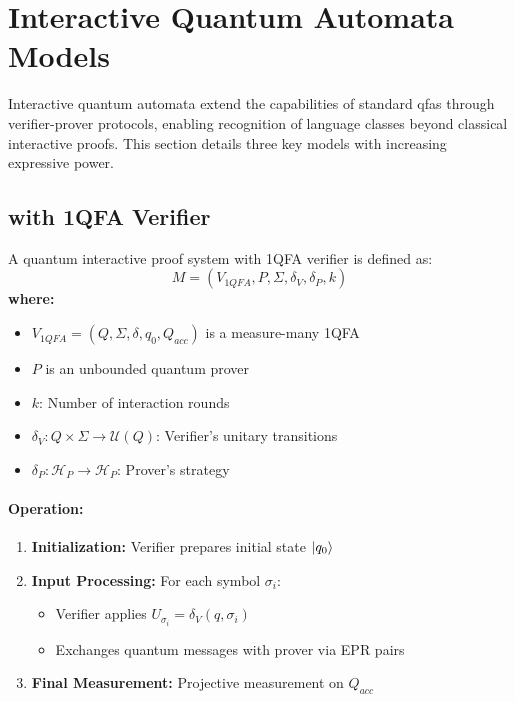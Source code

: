 \section{Interactive Quantum Automata Models}
\label{sec:interactive-quantum}

Interactive quantum automata extend the capabilities of standard \glspl{qfa} through verifier-prover protocols, enabling recognition of language classes beyond classical interactive proofs. This section details three key models with increasing expressive power.

\subsection{ with 1QFA Verifier}
\label{subsec:qip1qfa}

\begin{definition}
A quantum interactive proof system with 1QFA verifier is defined as:
\[
M = (V_{1QFA}, P, \Sigma, \delta_V, \delta_P, k)
\]
\textbf{where:}
\begin{itemize}
    \item $V_{1QFA} = (Q, \Sigma, \delta, q_0, Q_{acc})$ is a measure-many 1QFA
    \item $P$ is an unbounded quantum prover
    \item $k$: Number of interaction rounds
    \item $\delta_V: Q \times \Sigma \rightarrow \mathcal{U}(Q)$: Verifier's unitary transitions
    \item $\delta_P: \mathcal{H}_P \rightarrow \mathcal{H}_P$: Prover's strategy
\end{itemize}
\end{definition}

\paragraph{Operation:}
\begin{enumerate}
    \item \textbf{Initialization:} Verifier prepares initial state $\ket{q_0}$
    \item \textbf{Input Processing:} For each symbol $\sigma_i$:
    \begin{itemize}
        \item Verifier applies $U_{\sigma_i} = \delta_V(q, \sigma_i)$
        \item Exchanges quantum messages with prover via EPR pairs
    \end{itemize}
    \item \textbf{Final Measurement:} Projective measurement on $Q_{acc}$
\end{enumerate}

